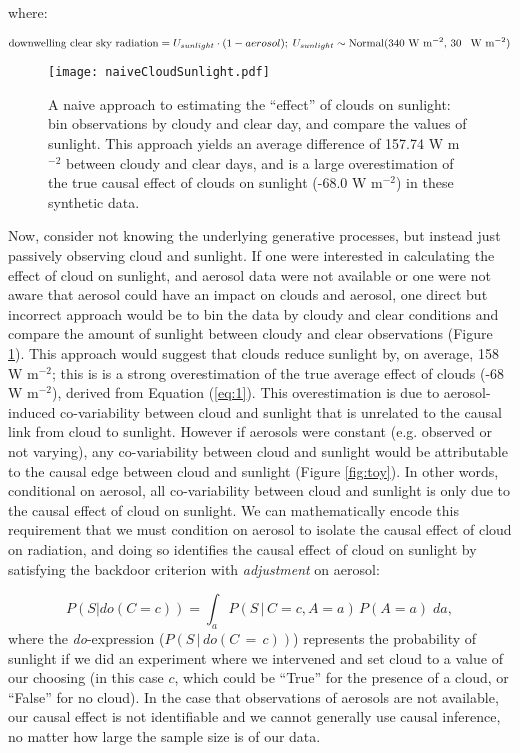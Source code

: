 \documentclass[12pt]{article}
\begin{document}
where:

\begin{equation*} \text{downwelling clear sky radiation} =
  U_{sunlight} \cdot (1 - aerosol); \; U_{sunlight} \sim
  \text{Normal(340 W m$^{-2}$, 30 \, W m$^{-2}$)}
\end{equation*}

\begin{figure} \texttt{[image: naiveCloudSunlight.pdf]}
  \caption{A naive approach to estimating the ``effect'' of clouds on
    sunlight: bin observations by cloudy and clear day, and compare the
    values of sunlight. This approach yields an average difference of
    157.74 W m$^{-2}$ between cloudy and clear days, and is a large
    overestimation of the true causal effect of clouds on sunlight (-68.0
    W m$^{-2}$) in these synthetic data.}
  \label{fig:naive-cloud-sunlight}
\end{figure}

Now, consider not knowing the underlying generative processes, but
instead just passively observing cloud and sunlight. If one were
interested in calculating the effect of cloud on sunlight, and aerosol
data were not available or one were not aware that aerosol could have
an impact on clouds and aerosol, one direct but incorrect approach
would be to bin the data by cloudy and clear conditions and compare
the amount of sunlight between cloudy and clear observations (Figure
\ref{fig:naive-cloud-sunlight}). This approach would suggest that
clouds reduce sunlight by, on average, 158 W m$^{-2}$; this is is a
strong overestimation of the true average effect of clouds (-68 W
m$^{-2}$), derived from Equation (\ref{eq:1}). This overestimation is
due to aerosol-induced co-variability between cloud and sunlight that
is unrelated to the causal link from cloud to sunlight. However if
aerosols were constant (e.g. observed or not varying), any
co-variability between cloud and sunlight would be attributable to the
causal edge between cloud and sunlight (Figure \ref{fig:toy}). In
other words, conditional on aerosol, all co-variability between cloud
and sunlight is only due to the causal effect of cloud on sunlight.
We can mathematically encode this requirement that we must condition
on aerosol to isolate the causal effect of cloud on radiation, and
doing so identifies the causal effect of cloud on sunlight by
satisfying the backdoor criterion with \textit{adjustment} on aerosol:

\begin{equation} P(S | do(C = c)) = \int_{a} P(S \, | \, C = c, A=a)
  \, P(A=a) \; da,
  \label{eq:3}
\end{equation} where the \textit{do}-expression ($P(S \, | \, do(C\, = \,c))$) represents the probability of sunlight
if we did an experiment where we intervened and set cloud to a value
of our choosing (in this case $c$, which could be ``True'' for the
presence of a cloud, or ``False'' for no cloud). In the case that observations of aerosols are not available, our causal effect is not identifiable and
we cannot generally use causal inference, no matter how large the
sample size is of our data.
\end{document}

